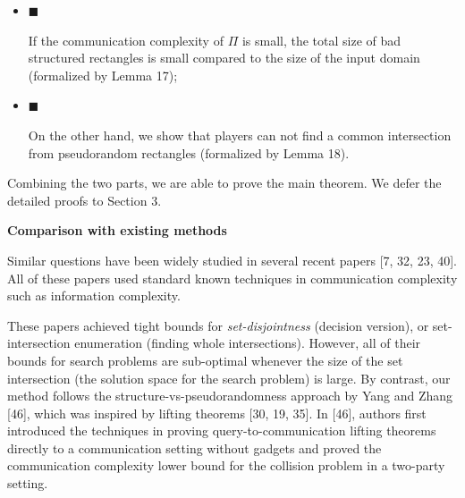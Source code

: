 \begin{itemize}


\item[] 
$\blacksquare$ 


If the communication complexity of $\Pi$ is small, the total size of bad structured rectangles is small compared to the size of the input domain (formalized by Lemma 17);\par





\item[] 
$\blacksquare$ 


On the other hand, we show that players can not find a common intersection from pseudorandom rectangles (formalized by Lemma 18).\par





\end{itemize}




Combining the two parts, we are able to prove the main theorem. We defer the detailed proofs to Section 3.\par




\par\medskip\noindent\textbf{Comparison with existing methods}\par




Similar questions have been widely studied in several recent papers [7, 32, 23, 40]. All of these papers used standard known techniques in communication complexity such as information complexity.\par




These papers achieved tight bounds for \emph{set-disjointness} (decision version), or set-intersection enumeration (finding whole intersections). However, all of their bounds for search problems are sub-optimal whenever the size of the set intersection (the solution space for the search problem) is large. By contrast, our method follows the structure-vs-pseudorandomness approach by Yang and Zhang [46], which was inspired by lifting theorems [30, 19, 35]. In [46], authors first introduced the techniques in proving query-to-communication lifting theorems directly to a communication setting without gadgets and proved the communication complexity lower bound for the collision problem in a two-party setting.\par




